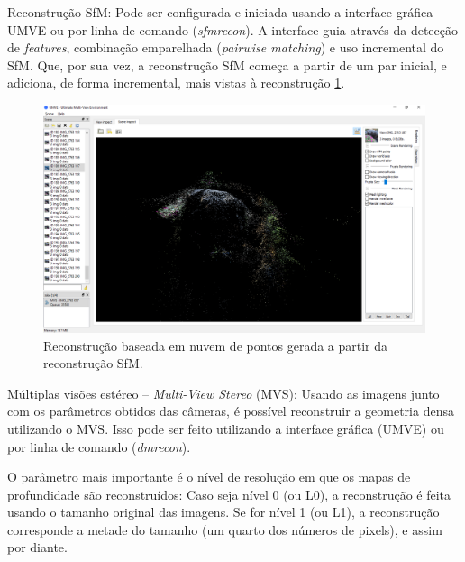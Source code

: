 Reconstrução SfM: Pode ser configurada e iniciada usando a interface gráfica UMVE ou por linha de comando (\emph{sfmrecon}). A interface guia através da detecção de \emph{features}, combinação emparelhada (\emph{pairwise matching}) e uso incremental do SfM. Que, por sua vez, a reconstrução SfM começa a partir de um par inicial, e adiciona, de forma incremental, mais vistas à reconstrução \ref{fig:mvesfm}.

\begin{figure}[!h]
	\centering
	\includegraphics[width=0.5\linewidth]{figs/umve5sfm.png}
	\caption{%
	Reconstrução baseada em nuvem de pontos gerada a partir da reconstrução SfM.%
	}\label{fig:mvesfm}
\end{figure}


%

Múltiplas visões estéreo -- \emph{Multi-View Stereo} (MVS): Usando as imagens junto com os parâmetros obtidos das câmeras, é possível reconstruir a geometria densa utilizando o MVS. Isso pode ser feito utilizando a interface gráfica (UMVE) ou por linha de comando (\emph{dmrecon}).

O parâmetro mais importante é o nível de resolução em que os mapas de profundidade são reconstruídos: Caso seja nível 0 (ou L0), a reconstrução é feita usando o tamanho original das imagens. Se for nível 1 (ou L1), a reconstrução corresponde a metade do tamanho (um quarto dos números de pixels), e assim por diante.

